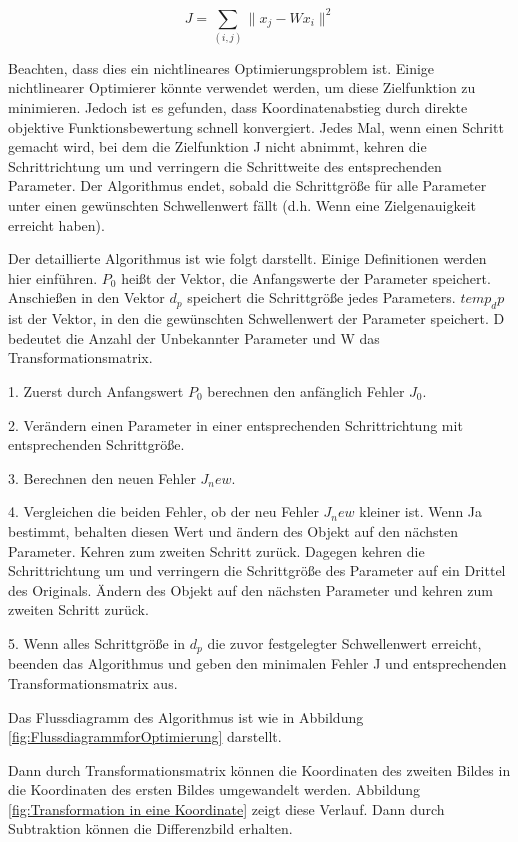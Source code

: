 \begin{equation}
   J = \sum_{(i,j)}\lVert x_j - Wx_i \rVert ^2
\end{equation}

Beachten, dass dies ein nichtlineares Optimierungsproblem ist. Einige nichtlinearer Optimierer könnte verwendet werden, um diese Zielfunktion zu minimieren. Jedoch ist es gefunden, dass Koordinatenabstieg durch direkte objektive Funktionsbewertung schnell konvergiert. Jedes Mal, wenn einen Schritt gemacht wird, bei dem die Zielfunktion J nicht abnimmt, kehren die Schrittrichtung um und verringern die Schrittweite des entsprechenden Parameter. Der Algorithmus endet, sobald die Schrittgröße für alle Parameter unter einen gewünschten Schwellenwert fällt (d.h. Wenn eine Zielgenauigkeit erreicht haben). 

Der detaillierte Algorithmus ist wie folgt darstellt. Einige Definitionen werden hier einführen. $P_0$ heißt der Vektor, die Anfangswerte der Parameter speichert. Anschießen in den Vektor $d_p$ speichert die Schrittgröße jedes Parameters. $temp_dp$ ist der Vektor, in den die gewünschten Schwellenwert der Parameter speichert. D bedeutet die Anzahl der Unbekannter Parameter und W das Transformationsmatrix.

1. Zuerst durch Anfangswert $P_0$ berechnen den anfänglich Fehler $J_0$.

2. Verändern einen Parameter in einer entsprechenden Schrittrichtung mit entsprechenden Schrittgröße.

3. Berechnen den neuen Fehler $J_new$.

4. Vergleichen die beiden Fehler, ob der neu Fehler $J_new$ kleiner ist. Wenn Ja bestimmt, behalten diesen Wert und ändern des Objekt auf den nächsten Parameter. Kehren zum zweiten Schritt zurück. Dagegen kehren die Schrittrichtung um und verringern die Schrittgröße des Parameter auf ein Drittel des Originals. Ändern des Objekt auf den nächsten Parameter und kehren zum zweiten Schritt zurück.

5. Wenn alles Schrittgröße in $d_p$ die zuvor festgelegter Schwellenwert erreicht, beenden das Algorithmus und geben den minimalen Fehler J und entsprechenden Transformationsmatrix aus.

Das Flussdiagramm des Algorithmus ist wie in Abbildung \ref{fig:FlussdiagrammforOptimierung} darstellt.

Dann durch Transformationsmatrix können die Koordinaten des zweiten Bildes in die Koordinaten des ersten Bildes umgewandelt werden. Abbildung \ref{fig:Transformation in eine Koordinate} zeigt diese Verlauf. Dann durch Subtraktion können die Differenzbild erhalten.

